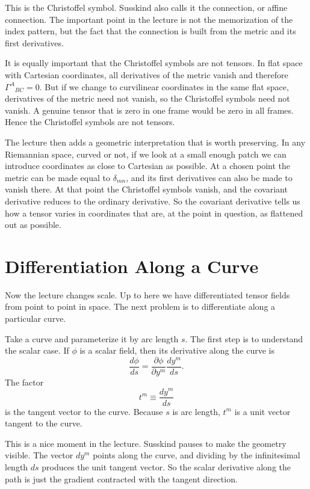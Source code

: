 This is the Christoffel symbol. Susskind also calls it the connection, or affine connection. The important point in the lecture is not the memorization of the index pattern, but the fact that the connection is built from the metric and its first derivatives.

It is equally important that the Christoffel symbols are not tensors. In flat space with Cartesian coordinates, all derivatives of the metric vanish and therefore \(\Gamma^A{}_{BC}=0\). But if we change to curvilinear coordinates in the same flat space, derivatives of the metric need not vanish, so the Christoffel symbols need not vanish. A genuine tensor that is zero in one frame would be zero in all frames. Hence the Christoffel symbols are not tensors.

The lecture then adds a geometric interpretation that is worth preserving. In any Riemannian space, curved or not, if we look at a small enough patch we can introduce coordinates as close to Cartesian as possible. At a chosen point the metric can be made equal to \(\delta_{mn}\), and its first derivatives can also be made to vanish there. At that point the Christoffel symbols vanish, and the covariant derivative reduces to the ordinary derivative. So the covariant derivative tells us how a tensor varies in coordinates that are, at the point in question, as flattened out as possible.

\section{Differentiation Along a Curve}

Now the lecture changes scale. Up to here we have differentiated tensor fields from point to point in space. The next problem is to differentiate along a particular curve.

Take a curve and parameterize it by arc length \(s\). The first step is to understand the scalar case. If \(\phi\) is a scalar field, then its derivative along the curve is
\begin{equation}
\frac{d\phi}{ds}
=
\frac{\partial \phi}{\partial y^m}\frac{dy^m}{ds}.
\end{equation}
The factor
\begin{equation}
t^m\equiv \frac{dy^m}{ds}
\end{equation}
is the tangent vector to the curve. Because \(s\) is arc length, \(t^m\) is a unit vector tangent to the curve.

This is a nice moment in the lecture. Susskind pauses to make the geometry visible. The vector \(dy^m\) points along the curve, and dividing by the infinitesimal length \(ds\) produces the unit tangent vector. So the scalar derivative along the path is just the gradient contracted with the tangent direction.

